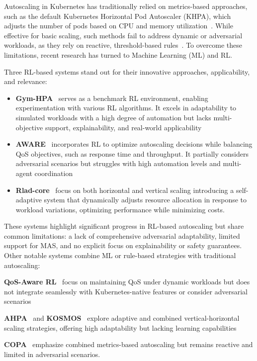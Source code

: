 \documentclass[conference]{IEEEtran}
\begin{document}
\noindent Autoscaling in Kubernetes has traditionally relied on metrics-based approaches, such as the default Kubernetes Horizontal Pod Autoscaler (KHPA), which adjusts the number of pods based on CPU and memory utilization~\cite{Carrion2022}. While effective for basic scaling, such methods fail to address dynamic or adversarial workloads, as they rely on reactive, threshold-based rules~\cite{Tran2022}. To overcome these limitations, recent research has turned to Machine Learning (ML) and RL.

Three RL-based systems stand out for their innovative approaches, applicability, and relevance:
%
\begin{itemize}
    \item \textbf{Gym-HPA}~\cite{gymhpa2022} serves as a benchmark RL environment, enabling experimentation with various RL algorithms. It excels in adaptability to simulated workloads with a high degree of automation but lacks multi-objective support, explainability, and real-world applicability
    \item \textbf{AWARE}~\cite{aware2023} incorporates RL to optimize autoscaling decisions while balancing QoS objectives, such as response time and throughput. It partially considers adversarial scenarios but struggles with high automation levels and multi-agent coordination
    \item \textbf{Rlad-core}~\cite{Rossi2019} focus on both horizontal and vertical scaling introducing a self-adaptive system that dynamically adjusts resource allocation in response to workload variations, optimizing performance while minimizing costs.
\end{itemize}

These systems highlight significant progress in RL-based autoscaling but share common limitations: a lack of comprehensive adversarial adaptability, limited support for MAS, and no explicit focus on explainability or safety guarantees.
%
Other notable systems combine ML or rule-based strategies with traditional autoscaling:
%
\begin{enumerate*}[label={}, itemjoin={;\quad }]
    \item \textbf{QoS-Aware RL}~\cite{QoSRL} focus on maintaining QoS under dynamic workloads but does not integrate seamlessly with Kubernetes-native features or consider adversarial scenarios
    \item \textbf{AHPA}~\cite{Zhou2024} and \textbf{KOSMOS}~\cite{KOSMOS} explore adaptive and combined vertical-horizontal scaling strategies, offering high adaptability but lacking learning capabilities
    \item \textbf{COPA}~\cite{COPA} emphasize combined metrics-based autoscaling but remains reactive and limited in adversarial scenarios.
\end{enumerate*}
\end{document}

